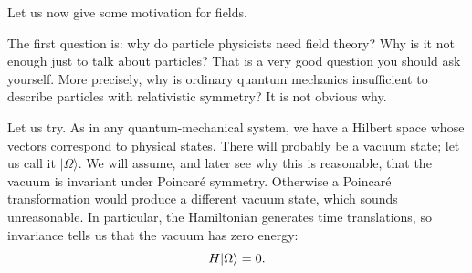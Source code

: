 Let us now give some motivation for fields.

The first question is: why do particle physicists need field theory? Why is it
not enough just to talk about particles? That is a very good question you should
ask yourself. More precisely, why is ordinary quantum mechanics insufficient
to describe particles with relativistic symmetry? It is not obvious why.

Let us try. As in any quantum-mechanical system, we have a Hilbert space whose
vectors correspond to physical states. There will probably be a vacuum state;
let us call it $|\Omega\rangle$.
We will assume, and later see why this is reasonable, that the vacuum is
invariant under Poincaré symmetry. Otherwise a Poincaré transformation would
produce a different vacuum state, which sounds unreasonable.
In particular, the Hamiltonian generates time translations, so invariance tells
us that the vacuum has zero energy:
\begin{equation}
  H\lvert \Omega\rangle=0.
  \label{eq:253a-vacuum-energy}
\end{equation}

